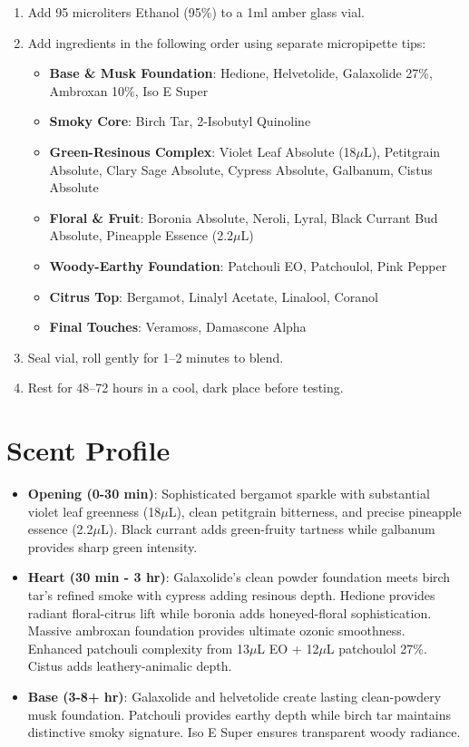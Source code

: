\documentclass{article}
\begin{document}
\begin{enumerate}
    \item Add 95 microliters Ethanol (95\%) to a 1ml amber glass vial.
    
    \item Add ingredients in the following order using separate micropipette tips:
    \begin{itemize}
        \item \textbf{Base \& Musk Foundation}: Hedione, Helvetolide, Galaxolide 27\%, Ambroxan 10\%, Iso E Super
        \item \textbf{Smoky Core}: Birch Tar, 2-Isobutyl Quinoline
        \item \textbf{Green-Resinous Complex}: Violet Leaf Absolute (18$\mu$L), Petitgrain Absolute, Clary Sage Absolute, Cypress Absolute, Galbanum, Cistus Absolute
        \item \textbf{Floral \& Fruit}: Boronia Absolute, Neroli, Lyral, Black Currant Bud Absolute, Pineapple Essence (2.2$\mu$L)
        \item \textbf{Woody-Earthy Foundation}: Patchouli EO, Patchoulol, Pink Pepper
        \item \textbf{Citrus Top}: Bergamot, Linalyl Acetate, Linalool, Coranol
        \item \textbf{Final Touches}: Veramoss, Damascone Alpha
    \end{itemize}
    
    \item Seal vial, roll gently for 1--2 minutes to blend.
    
    \item Rest for 48--72 hours in a cool, dark place before testing.
\end{enumerate}

\section{Scent Profile}

\begin{itemize}
    \item \textbf{Opening (0-30 min)}: Sophisticated bergamot sparkle with substantial violet leaf greenness (18$\mu$L), clean petitgrain bitterness, and precise pineapple essence (2.2$\mu$L). Black currant adds green-fruity tartness while galbanum provides sharp green intensity.
    
    \item \textbf{Heart (30 min - 3 hr)}: Galaxolide's clean powder foundation meets birch tar's refined smoke with cypress adding resinous depth. Hedione provides radiant floral-citrus lift while boronia adds honeyed-floral sophistication. Massive ambroxan foundation provides ultimate ozonic smoothness. Enhanced patchouli complexity from 13$\mu$L EO + 12$\mu$L patchoulol 27\%. Cistus adds leathery-animalic depth.
    
    \item \textbf{Base (3-8+ hr)}: Galaxolide and helvetolide create lasting clean-powdery musk foundation. Patchouli provides earthy depth while birch tar maintains distinctive smoky signature. Iso E Super ensures transparent woody radiance.
\end{itemize}
\end{document}
